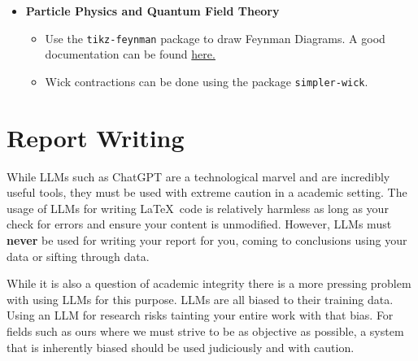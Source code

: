 \documentclass[english,10pt,a4paper, openany, oneside]{book}
\begin{document}
\begin{itemize}
\begin{itemize}
		\item Define a few helper commands for solar mass and other units. There is probably a package for this but this is pretty easy to do by hand.
	\end{itemize}
	\item \textbf{Particle Physics and Quantum Field Theory}
	\begin{itemize}
		\item Use the \texttt{tikz-feynman} package to draw Feynman Diagrams. A good documentation can be found \href{https://in.mirrors.cicku.me/ctan/graphics/pgf/contrib/tikz-feynman/tikz-feynman.pdf}{here.}
		\item Wick contractions can be done using the package \verb*|simpler-wick|.
	\end{itemize}
\end{itemize}	

	\chapter{Report Writing}
	\begin{tcolorbox}[colback=red!5!white,colframe=darkred!75!black,title={\large \textbf{An Advisory on ChatGPT and other LLMs}}]
		While LLMs such as ChatGPT are a technological marvel and are incredibly useful tools, they must be used with extreme caution in a academic setting. The usage of LLMs for writing \LaTeX\ code is relatively harmless as long as your check for errors and ensure your content is unmodified. However, LLMs must \textbf{never} be used for writing your report for you, coming to conclusions using your data or sifting through data. \bigskip
		
		While it is also a question of academic integrity there is a more pressing problem with using LLMs for this purpose. LLMs are all biased to their training data. Using an LLM for research risks tainting your entire work with that bias. For fields such as ours where we must strive to be as objective as possible, a system that is inherently biased should be used judiciously and with caution.
	\end{tcolorbox}
\end{document}
